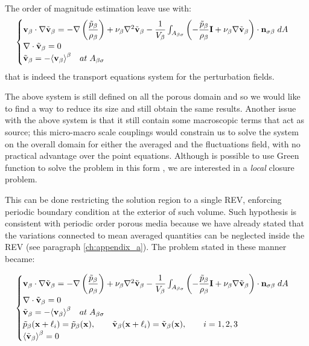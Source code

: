 The order of magnitude estimation leave use with:
\begin{eqnarray}
	\begin{cases}
		\textbf{v}_{\beta} \cdot \nabla \tilde{\textbf{v}}_{\beta} = -\nabla \left(\dfrac{\tilde{p}_{\beta}}{\rho_{\beta}}\right) + \nu_{\beta} \nabla^2 \tilde{\textbf{v}}_{\beta} - \dfrac{1}{V_\beta} \int_{A_{\beta \sigma}} \left(-\dfrac{\tilde{p}_{\beta}}{\rho_{\beta}} \mathbf{I}  + \nu_{\beta} \nabla \tilde{\textbf{v}}_{\beta} \right) \cdot \mathbf{n}_{\sigma \beta} \;dA  \\
		\nabla \cdot \tilde{\textbf{v}}_{\beta} = 0  \\
		\tilde{\textbf{v}}_{\beta} = -{\left< \textbf{v}_{\beta} \right>}^{\beta} \quad at \; A_{\beta \sigma}
	\end{cases}
\label{eq:vans_mom_}
\end{eqnarray}
that is indeed the transport equations system for the perturbation fields.

The above system is still defined on all the porous domain and so we would like to find a way to reduce its size and still obtain the same results.
Another issue with the above system is that it still contain some macroscopic terms that act as source; this micro-macro scale couplings would constrain us to solve the system on the overall domain for either the averaged and the fluctuations field, with no practical advantage over the point equations.
Although is possible to use Green function to solve the problem in this form \citet{wood2013volume}, we are interested in a \textit{local} closure problem.

This can be done restricting the solution region to a single REV, enforcing periodic boundary condition at the exterior of such volume.
Such hypothesis is consistent with periodic order porous media because we have already stated that the variations connected to mean averaged quantities can be neglected inside the REV (see paragraph \ref{ch:appendix_a}).
The problem stated in these manner became:

\begin{eqnarray}
\begin{cases}
\textbf{v}_{\beta} \cdot \nabla \tilde{\textbf{v}}_{\beta} = -\nabla \left(\dfrac{\tilde{p}_{\beta}}{\rho_{\beta}}\right) + \nu_{\beta} \nabla^2 \tilde{\textbf{v}}_{\beta} - \dfrac{1}{V_\beta} \int_{A_{\beta \sigma}} \left(-\dfrac{\tilde{p}_{\beta}}{\rho_{\beta}} \mathbf{I}  + \nu_{\beta} \nabla \tilde{\textbf{v}}_{\beta} \right) \cdot \mathbf{n}_{\sigma \beta} \;dA  \\
\nabla \cdot \tilde{\textbf{v}}_{\beta} = 0  \\
\tilde{\textbf{v}}_{\beta} = -{\left< \textbf{v}_{\beta} \right>}^{\beta} \quad at \; A_{\beta \sigma} \\
\tilde{p}_{\beta}(\mathbf{x} +\ell_i) = \tilde{p}_{\beta}(\mathbf{x}), \qquad \tilde{\textbf{v}}_{\beta}(\mathbf{x} +\ell_i) = \tilde{\textbf{v}}_{\beta}(\mathbf{x}), \qquad i=1,2,3 \\
{\left< \tilde{\textbf{v}}_{\beta} \right>}^{\beta} = 0
\end{cases}
\label{eq:vans_mom_2}
\end{eqnarray}

